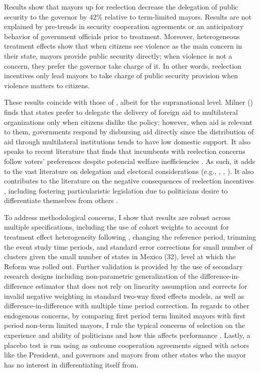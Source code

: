 \documentclass[12pt]{amsart}
\numberwithin{equation}{section}
\theoremstyle{definition}
\theoremstyle{definition}
\theoremstyle{definition}
\begin{document}
Results show that mayors up for reelection decrease the delegation of public security to the governor by 42\% relative to term-limited mayors. Results are not explained by pre-trends in security cooperation agreements or an anticipatory behavior of government officials prior to treatment.  Moreover, heterogeneous treatment effects show that when citizens see violence as the main concern in their state, mayors provide public security directly; when violence is not a concern, they prefer the governor take charge of it. In other words, reelection incentives only lead mayors to take charge of public security provision when violence matters to citizens.
 
These results coincide with those of \citet{milner_2004}, albeit for the supranational level. Milner (\citeyear{milner_2004}) finds that states prefer to delegate the delivery of foreign aid to multilateral organizations only when citizens dislike the policy; however, when aid is relevant to them, governments respond by disbursing aid directly since the distribution of aid through multilateral institutions tends to have low domestic support. It also speaks to recent literature that finds that incumbents with reelection concerns follow voters’ preferences despite potencial welfare inefficiencies \citep{pulejo_querubin_2021}. As such, it adds to the vast literature on delegation and electoral considerations (e.g., \citet{mccubbins_1991}, \citet{fiorina_1982}, \citet{loftis_2014}). It also contributes to the literature on the negative consequences of reelection incentives \citep{coviello_etal_2017}, including fostering  particularistic legislation due to politicians desire to differentiate themselves from others \citep{motolinia_2020}.             
       
To address methodological concerns, I show that results are robust across multiple specifications, including the use of cohort weights to account for treatment effect heterogeneity following \citet{abraham_sun_2020}, changing the reference period, trimming the event study time periods, and standard error corrections for small number of clusters given the small number of states in Mexico (32), level at which the Reform was rolled out. Further validation is provided by the use of secondary research designs including \citet{imai_etal_2020} non-parametric generalization of the difference-in-difference estimator that does not rely on linearity assumption and corrects for invalid negative weighting in standard two-way fixed effects models, as well as \citet{chaisemarting_etal_2019} difference-in-difference with multiple time period correction. In regards to other endogenous concerns, by comparing first period term limited mayors with first period non-term limited mayors, I rule the typical concerns of selection on the experience and ability of politicians \citep{samuelson_1984, dalbo_etal_2017} and how this affects performance \citep{ferraz_finan_2011}. Lastly, a placebo test is run using as outcome cooperation agreements signed with actors like the President, and governors and mayors from other states who the mayor has no interest in differentiating itself from.%
\end{document}

